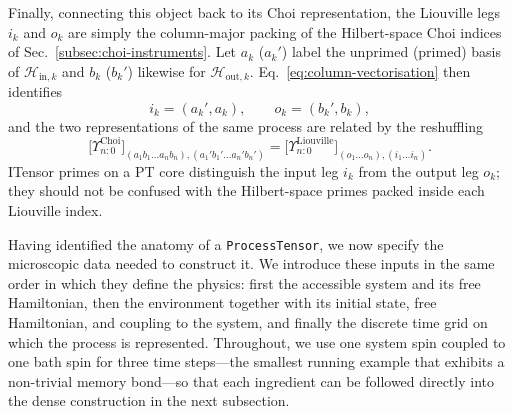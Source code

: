 Finally, connecting this object back to its Choi representation, the Liouville legs \(i_k\) and \(o_k\) are simply the column-major packing of the Hilbert-space Choi indices of Sec.~\ref{subsec:choi-instruments}.
Let \(a_k\) (\(a_k'\)) label the unprimed (primed) basis of \(\mathcal H_{\mathrm{in},k}\) and \(b_k\) (\(b_k'\)) likewise for \(\mathcal H_{\mathrm{out},k}\).
Eq.~\eqref{eq:column-vectorisation} then identifies
%
\begin{equation}
    i_k=(a_k',a_k),\qquad o_k=(b_k',b_k),
    \label{eq:choi-liouville-index-map}
\end{equation}
%
and the two representations of the same process are related by the reshuffling
%
\begin{equation}
    \bigl[\Upsilon_{n:0}^{\mathrm{Choi}}\bigr]_{(a_1 b_1\dots a_{n}b_{n}),(a_1' b_1'\dots a_{n}'b_{n}')}
    =
    \bigl[\Upsilon_{n:0}^{\mathrm{Liouville}}\bigr]_{(o_1\dots o_{n}),(i_1\dots i_{n})}.
    \label{eq:choi-to-liouville}
\end{equation}
%
ITensor primes on a PT core distinguish the input leg \(i_k\) from the output leg \(o_k\); they should not be confused with the Hilbert-space primes packed inside each Liouville index.

\label{subsec:pt-ingredients}

Having identified the anatomy of a \texttt{ProcessTensor}, we now specify the microscopic data needed to construct it.
We introduce these inputs in the same order in which they define the physics: first the accessible system and its free Hamiltonian, then the environment together with its initial state, free Hamiltonian, and coupling to the system, and finally the discrete time grid on which the process is represented.
Throughout, we use one system spin coupled to one bath spin for three time steps---the smallest running example that exhibits a non-trivial memory bond---so that each ingredient can be followed directly into the dense construction in the next subsection.

